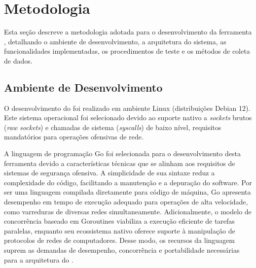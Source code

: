 \section{Metodologia}
Esta seção descreve a metodologia adotada para o desenvolvimento da ferramenta \offscan, detalhando o ambiente de desenvolvimento, a arquitetura do sistema, as funcionalidades implementadas, os procedimentos de teste e os métodos de coleta de dados.

\subsection{Ambiente de Desenvolvimento}
O desenvolvimento do \offscan foi realizado em ambiente Linux (distribuições Debian 12). Este sistema operacional foi selecionado devido ao suporte nativo a \textit{sockets} brutos (\textit{raw sockets}) e chamadas de sistema (\textit{syscalls}) de baixo nível, requisitos mandatórios para operações ofensivas de rede. 

A linguagem de programação Go foi selecionada para o desenvolvimento desta ferramenta devido a características técnicas que se alinham aos requisitos de sistemas de segurança ofensiva. A simplicidade de sua sintaxe reduz a complexidade do código, facilitando a manutenção e a depuração do software. Por ser uma linguagem compilada diretamente para código de máquina, Go apresenta desempenho em tempo de execução adequado para operações de alta velocidade, como varreduras de diversas redes simultaneamente. Adicionalmente, o modelo de concorrência baseado em Goroutines viabiliza a execução eficiente de tarefas paralelas, enquanto seu ecossistema nativo oferece suporte à manipulação de protocolos de redes de computadores. Desse modo, os recursos da linguagem suprem as demandas de desempenho, concorrência e portabilidade necessárias para a arquitetura do \offscan.

